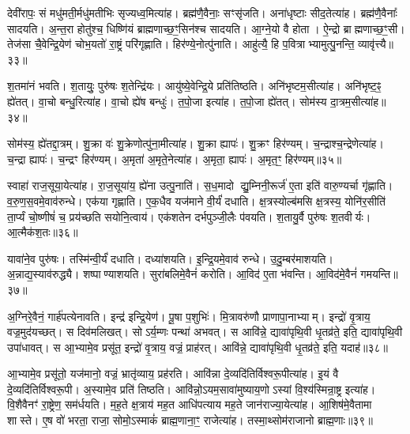 देवी॑रापः॒ सं मधु॑मती॒र्मधु॑मतीभिः सृज्यध्व॒मित्या॑ह।
ब्रह्म॑णै॒वैनाः॒ सꣳसृ॑जति।
अना॑धृष्टाः सीद॒तेत्या॑ह।
ब्रह्म॑णै॒वैनाः᳚ सादयति।
अ॒न्त॒रा होतु॑श्च॒ धिष्णि॑यं ब्राह्मणाच्छ॒ꣳ॒सिन॑श्च सादयति।
आ॒ग्ने॒यो वै होता।
ऐ॒न्द्रो ब्राह्मणाच्छ॒ꣳ॒सी।
तेज॑सा चै॒वेन्द्रि॒येण॑ चोभ॒यतो॑ रा॒ष्ट्रं परि॑गृह्णाति।
हिर॑ण्ये॒नोत्पु॑नाति।
आहु॑त्यै॒ हि प॒वित्राभ्यामुत्पु॒नन्ति॒ व्यावृ॑त्त्यै॥३३॥

श॒तमा॑नं भवति।
श॒तायुः॒ पुरु॑षः श॒तेन्द्रि॑यः।
आयु॑ष्ये॒वेन्द्रि॒ये प्रति॑तिष्ठति।
अनि॑भृष्टम॒सीत्या॑ह।
अनि॑भृष्ट॒ꣴ॒ ह्ये॑तत्।
वा॒चो बन्धु॒रित्या॑ह।
वा॒चो ह्ये॑ष बन्धुः॑।
त॒पो॒जा इत्या॑ह।
त॒पो॒जा ह्ये॑तत्।
सोम॑स्य दा॒त्रम॒सीत्या॑ह॥३४॥

सोम॑स्य॒ ह्ये॑तद्दा॒त्रम्।
शु॒क्रा वः॑ शु॒क्रेणोत्पु॑ना॒मीत्या॑ह।
शु॒क्रा ह्यापः॑।
शु॒क्रꣳ हिर॑ण्यम्।
च॒न्द्राश्च॒न्द्रेणेत्या॑ह।
च॒न्द्रा ह्यापः॑।
च॒न्द्रꣳ हिर॑ण्यम्।
अ॒मृता॑ अ॒मृते॒नेत्या॑ह।
अ॒मृता॒ ह्यापः॑।
अ॒मृत॒ꣳ॒ हिर॑ण्यम्॥३५॥

स्वाहा॑ राज॒सूया॒येत्या॑ह।
रा॒ज॒सूया॑य॒ ह्ये॑ना उत्पु॒नाति॑।
स॒ध॒मादो द्यु॒म्निनी॒रूर्ज॑ ए॒ता इति॑ वारु॒ण्यर्चा गृ॑ह्णाति।
व॒रु॒ण॒स॒वमे॒वाव॑रुन्धे।
एक॑या गृह्णाति।
ए॒क॒धैव यज॑माने वी॒र्यं॑ दधाति।
क्ष॒त्रस्योल्ब॑मसि क्ष॒त्रस्य॒ योनि॑र॒सीति॑ ता॒र्प्यं चो॒ष्णीषं॑ च॒ प्रय॑च्छति सयोनि॒त्वाय॑।
एक॑शतेन दर्भपुञ्जी॒लैः प॑वयति।
श॒तायु॒र्वै पुरु॑षः श॒तवीर्यः।
आ॒त्मैक॑श॒तः॥३६॥

यावा॑ने॒व पुरु॑षः।
तस्मि॑न्वी॒र्यं॑ दधाति।
दध्या॑शयति।
इ॒न्द्रि॒यमे॒वाव॑ रुन्धे।
उ॒दु॒म्बर॑माशयति।
अ॒न्नाद्य॒स्याव॑रुद्ध्यै।
शष्पाण्याशयति।
सुरा॑बलिमे॒वैनं॑ करोति।
आ॒विद॑ ए॒ता भ॑वन्ति।
आ॒विद॑मे॒वैनं॑ गमयन्ति॥३७॥

अ॒ग्निरे॒वैनं॒ गार्\mbox{}ह॑पत्येनावति।
इन्द्र॑ इन्द्रि॒येण॑।
पू॒षा प॒शुभिः॑।
मि॒त्रावरु॑णौ प्राणापा॒नाभ्याम्।
इन्द्रो॑ वृ॒त्राय॒ वज्र॒मुद॑यच्छत्।
स दिव॑मलिखत्।
सोऽर्य॒म्णः पन्था॑ अभवत्।
स आवि॑न्ने॒ द्यावा॑पृथि॒वी धृ॒तव्र॑ते॒ इति॒ द्यावा॑पृथि॒वी उपा॑धावत्।
स आ॒भ्यामे॒व प्रसू॑त॒ इन्द्रो॑ वृ॒त्राय॒ वज्रं॒ प्राह॑रत्।
आवि॑न्ने॒ द्यावा॑पृथि॒वी धृ॒तव्र॑ते॒ इति॒ यदाह॑॥३८॥

आ॒भ्यामे॒व प्रसू॑तो॒ यज॑मानो॒ वज्रं॒ भ्रातृ॑व्याय॒ प्रह॑रति।
आवि॑न्ना दे॒व्यदि॑तिर्विश्वरू॒पीत्या॑ह।
इ॒यं वै दे॒व्यदि॑तिर्विश्व\-रू॒पी।
अ॒स्यामे॒व प्रति॑ तिष्ठति।
आवि॑न्नो॒\-ऽयम॒सावा॑मुष्या\-य॒णो\-ऽस्यां वि॒श्य॑स्मिन्रा॒ष्ट्र इत्या॑ह।
वि॒शैवैनꣳ॑ रा॒ष्ट्रेण॒ सम॑र्धयति।
म॒ह॒ते क्ष॒त्राय॑ मह॒त आधि॑पत्याय मह॒ते जान॑राज्या॒येत्या॑ह।
आ॒शिष॑मे॒वैतामा शास्ते।
ए॒ष वो॑ भरता॒ राजा॒ सोमो॒\-ऽस्माकं॑ ब्राह्म॒णाना॒ꣳ॒ राजेत्या॑ह।
तस्मा॒थ्सोम॑राजानो ब्राह्म॒णाः॥३९॥

